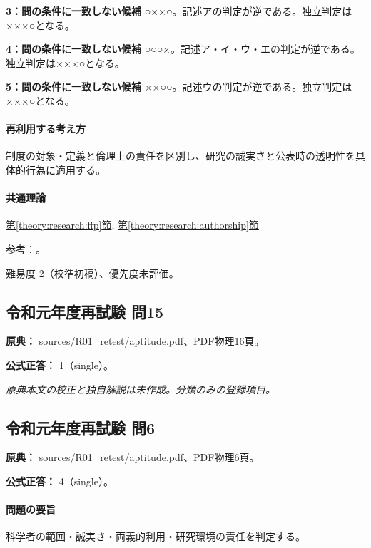 \noindent\textbf{3：問の条件に一致しない候補} ○××○。記述アの判定が逆である。独立判定は×××○となる。\par

\noindent\textbf{4：問の条件に一致しない候補} ○○○×。記述ア・イ・ウ・エの判定が逆である。独立判定は×××○となる。\par

\noindent\textbf{5：問の条件に一致しない候補} ××○○。記述ウの判定が逆である。独立判定は×××○となる。\par

\paragraph{再利用する考え方} 制度の対象・定義と倫理上の責任を区別し、研究の誠実さと公表時の透明性を具体的行為に適用する。

\paragraph{共通理論} \hyperref[theory:research:ffp]{第\ref*{theory:research:ffp}節}, \hyperref[theory:research:authorship]{第\ref*{theory:research:authorship}節}

\par 参考：\cite{mext_misconduct2014,jsps_integrity2025}。

\par 難易度 2（校準初稿）、優先度未評価。

\subsection{令和元年度再試験 問15}
\label{q:r01-ret-apt-15}

\noindent\textbf{原典：} sources/R01\_retest/aptitude.pdf、PDF物理16頁。

\textbf{公式正答：} 1（single）。

\par\textit{原典本文の校正と独自解説は未作成。分類のみの登録項目。}

\subsection{令和元年度再試験 問6}
\label{q:r01-ret-apt-06}

\noindent\textbf{原典：} sources/R01\_retest/aptitude.pdf、PDF物理6頁。

\textbf{公式正答：} 4（single）。

\paragraph{問題の要旨} 科学者の範囲・誠実さ・両義的利用・研究環境の責任を判定する。

